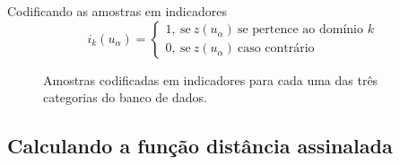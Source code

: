\documentclass[aspectratio=169]{beamer}
\begin{document}
\begin{frame}{Codificando as amostras em indicadores}
	\begin{equation}
	i_k(u_\alpha)=\begin{cases}
	1,\:\textrm{se}\:z(u_\alpha)\:\textrm{se pertence ao domínio $k$}\\
	0,\:\textrm{se}\:z(u_\alpha)\:\textrm{caso contrário}\end{cases}
	\label{eq_ind}
	\end{equation}
	
	\begin{figure}[H]
		\caption{Amostras codificadas em indicadores para cada uma das três categorias do banco de dados.} \label{ind}
		\centering
	\end{figure}
\end{frame}

\subsection{Calculando a função distância assinalada}
\end{document}
